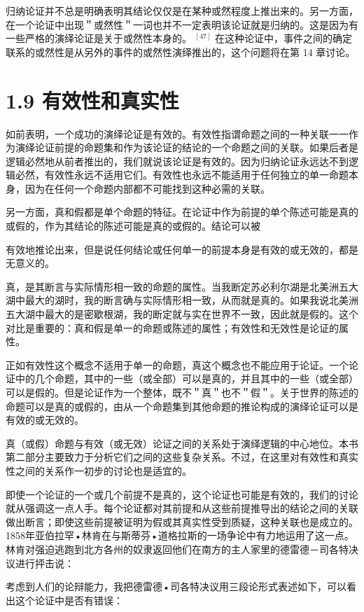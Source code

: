 归纳论证并不总是明确表明其结论仅仅是在某种或然程度上推出来的。另一方面，在一个论证中出现＂或然性＂一词也并不一定表明该论证就是归纳的。这是因为有一些严格的演绎论证是关于或然性本身的。 ${ }^{[47]}$ 在这种论证中，事件之间的确定联系的或然性是从另外的事件的或然性演绎推出的，这个问题将在第 14 章讨论。

\section*{1.9 有效性和真实性}
如前表明，一个成功的演绎论证是有效的。有效性指谓命题之间的一种关联一一作为演绎论证前提的命题集和作为该论证的结论的一个命题之间的关联。如果后者是逻辑必然地从前者推出的，我们就说该论证是有效的。因为归纳论证永远达不到逻辑必然，有效性永远不适用它们。有效性也永远不能适用于任何独立的单一命题本身，因为在任何一个命题内部都不可能找到这种必需的关联。

另一方面，真和假都是单个命题的特征。在论证中作为前提的单个陈述可能是真的或假的，作为其结论的陈述可能是真的或假的。结论可以被

有效地推论出来，但是说任何结论或任何单一的前提本身是有效的或无效的，都是无意义的。

真，是其断言与实际情形相一致的命题的属性。当我断定苏必利尔湖是北美洲五大湖中最大的湖时，我的断言确与实际情形相一致，从而就是真的。如果我说北美洲五大湖中最大的是密歇根湖，我的断定就与实在世界不一致，因此就是假的。这个对比是重要的：真和假是单一的命题或陈述的属性；有效性和无效性是论证的属性。

正如有效性这个概念不适用于单一的命题，真这个概念也不能应用于论证。一个论证中的几个命题，其中的一些（或全部）可以是真的，并且其中的一些（或全部）可以是假的。但是论证作为一个整体，既不＂真＂也不＂假＂。关于世界的陈述的命题可以是真的或假的，由从一个命题集到其他命题的推论构成的演绎论证可以是有效的或无效的。

真（或假）命题与有效（或无效）论证之间的关系处于演绎逻辑的中心地位。本书第二部分主要致力于分析它们之间的这些复杂关系。不过，在这里对有效性和真实性之间的关系作一初步的讨论也是适宜的。

即使一个论证的一个或几个前提不是真的，这个论证也可能是有效的，我们的讨论就从强调这一点人手。每个论证都对其前提和从这些前提推导出的结论之间的关联做出断言；即使这些前提被证明为假或其真实性受到质疑，这种关联也是成立的。1858年亚伯拉罕•林肯在与斯蒂芬•道格拉斯的一场争论中有力地运用了这一点。林肯对强迫逃跑到北方各州的奴隶返回他们在南方的主人家里的德雷德－司各特决议进行抨击说：

考虑到人们的论辩能力，我把德雷德•司各特决议用三段论形式表述如下，可以看出这个论证中是否有错误：

